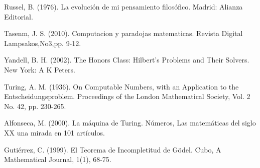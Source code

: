 \documentclass{article}
\begin{document}
Russel, B. (1976). La evolución de mi pensamiento filosófico. Madrid: Alianza Editorial.
\vspace{10pt}

Tasenm, J. S. (2010). Computacion y paradojas matematicas. Revista Digital Lampsakos,No3,pp. 9-12.
\vspace{10pt}

Yandell, B. H. (2002). The Honors Class: Hilbert's Problems and Their Solvers. New York: A K Peters.
\vspace{10pt}

Turing, A. M. (1936). On Computable Numbers, with an Application to the Entscheidungsproblem. Proceedings of the London Mathematical Society, Vol. 2 No. 42, pp. 230-265.
\vspace{10pt}

Alfonseca, M. (2000). La máquina de Turing. Números, Las matemáticas del siglo XX una mirada en 101 artículos.
\vspace{10pt}

Gutiérrez, C. (1999). El Teorema de Incompletitud de Gödel. Cubo, A Mathematical Journal, 1(1), 68-75.
\vspace{10pt}
\end{document}
